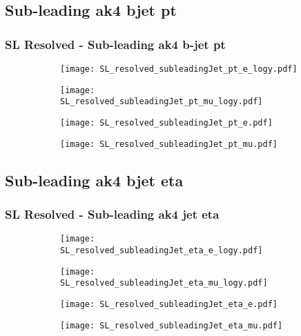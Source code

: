 \documentclass[aspectratio=169,8pt]{beamer}
\begin{document}
\subsection{Sub-leading ak4 bjet pt}
\begin{frame}
\frametitle{SL Resolved - Sub-leading ak4 b-jet pt}
\begin{figure}
\captionsetup[subfigure]{labelformat=empty}
\begin{subfigure}{0.375\textwidth}
\texttt{[image: SL\_resolved\_subleadingJet\_pt\_e\_logy.pdf]}
\vspace*{-0.15cm}
\end{subfigure}
\hfil
\begin{subfigure}{0.375\textwidth}
\texttt{[image: SL\_resolved\_subleadingJet\_pt\_mu\_logy.pdf]}
\vspace*{-0.15cm}
\end{subfigure}
\hfil
\begin{subfigure}{0.375\textwidth}
\texttt{[image: SL\_resolved\_subleadingJet\_pt\_e.pdf]}
\vspace*{-0.15cm}
\end{subfigure}
\hfil
\begin{subfigure}{0.375\textwidth}
\texttt{[image: SL\_resolved\_subleadingJet\_pt\_mu.pdf]}
\vspace*{-0.15cm}
\end{subfigure}
\hfil
\end{figure}
\end{frame}
\newpage

\subsection{Sub-leading ak4 bjet eta}
\begin{frame}
\frametitle{SL Resolved - Sub-leading ak4 jet eta}
\begin{figure}
\captionsetup[subfigure]{labelformat=empty}
\begin{subfigure}{0.375\textwidth}
\texttt{[image: SL\_resolved\_subleadingJet\_eta\_e\_logy.pdf]}
\vspace*{-0.15cm}
\end{subfigure}
\hfil
\begin{subfigure}{0.375\textwidth}
\texttt{[image: SL\_resolved\_subleadingJet\_eta\_mu\_logy.pdf]}
\vspace*{-0.15cm}
\end{subfigure}
\hfil
\begin{subfigure}{0.375\textwidth}
\texttt{[image: SL\_resolved\_subleadingJet\_eta\_e.pdf]}
\vspace*{-0.15cm}
\end{subfigure}
\hfil
\begin{subfigure}{0.375\textwidth}
\texttt{[image: SL\_resolved\_subleadingJet\_eta\_mu.pdf]}
\vspace*{-0.15cm}
\end{subfigure}
\hfil
\end{figure}
\end{frame}
\newpage
\end{document}
